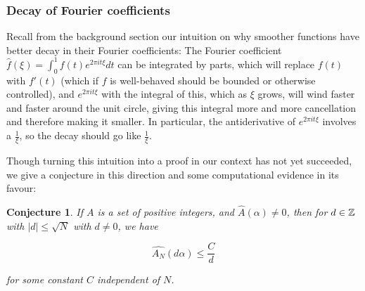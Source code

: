 \documentclass{article}
\newtheorem{conjecture}[theorem]{Conjecture}
\theoremstyle{definition}
\theoremstyle{remark}
\numberwithin{equation}{section}
\begin{document}
\subsubsection{Decay of Fourier coefficients}

Recall from the background section our intuition on why smoother
functions have better decay in their Fourier coefficients: The Fourier
coefficient $\widehat{f}(\xi) = \int_0^1 f(t) e^{2\pi i t \xi} dt$ can
be integrated by parts, which will replace $f(t)$ with $f'(t)$ (which
if $f$ is well-behaved should be bounded or otherwise controlled), and
$e^{2\pi i t \xi}$ with the integral of this, which as $\xi$ grows,
will wind faster and faster around the unit circle, giving this
integral more and more cancellation and therefore making it smaller.
In particular, the antiderivative of $e^{2\pi i t \xi}$ involves a
$\frac{1}{\xi}$, so the decay should go like $\frac{1}{\xi}$.

Though turning this intuition into a proof in our context has not yet
succeeded, we give a conjecture in this direction and some
computational evidence in its favour: 

\begin{conjecture}\label{conj:decay} 
  If $A$ is a \relevant set of positive integers, and
  $\widehat{A}(\alpha) \neq 0$, then for $d \in \mathbb{Z}$ with $|d| \leq \sqrt{N}$ with $d \neq 0$,
  we have

  \[\widehat{A_N}(d\alpha) \leq \frac{C}{d}\]

  for some constant $C$ independent of $N$.  
\end{conjecture}





\end{document}
